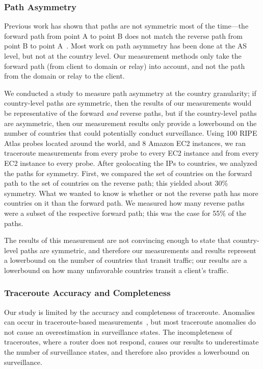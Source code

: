 \subsubsection{Path Asymmetry}
Previous work has shown that paths are not symmetric most of the time---the forward path from point A to point B does not match the reverse path from point B to point A~\cite{he2005routing}.  Most work on path asymmetry has been done at the AS level, but not at the country level.  Our measurement methods only take the forward path (from client to domain or relay) into account, and not the path from the domain or relay to the client.  

We conducted a study to measure path asymmetry at the country granularity; if country-level paths are symmetric, then the results of our measurements would be representative of the forward {\it and} reverse paths, but if the country-level paths are asymmetric, then our measurement results only provide a lowerbound on the number of countries that could potentially conduct surveillance.  Using 100 RIPE Atlas probes located around the world, and 8 Amazon EC2 instances, we ran traceroute measurements from every probe to every EC2 instance and from every EC2 instance to every probe.  After geolocating the IPs to countries, we analyzed the paths for symmetry.  First, we compared the set of countries on the forward path to the set of countries on the reverse path; this yielded about 30\% symmetry.  What we wanted to know is whether or not the reverse path has more countries on it than the forward path.  We measured how many reverse paths were a subset of the respective forward path; this was the case for 55\% of the paths.  

The results of this measurement are not convincing enough to state that country-level paths are symmetric, and therefore our measurements and results represent a lowerbound on the number of countries that transit traffic; our results are a lowerbound on how many unfavorable countries transit a client's traffic.

\subsubsection{Traceroute Accuracy and Completeness}
Our study is limited by the accuracy and completeness of traceroute.  Anomalies can occur in traceroute-based measurements~\cite{augustin2006avoiding}, but most traceroute anomalies do not cause an overestimation in surveillance states.  The incompleteness of traceroutes, where a router does not respond, causes our results to underestimate the number of surveillance states, and therefore also provides a lowerbound on surveillance.
